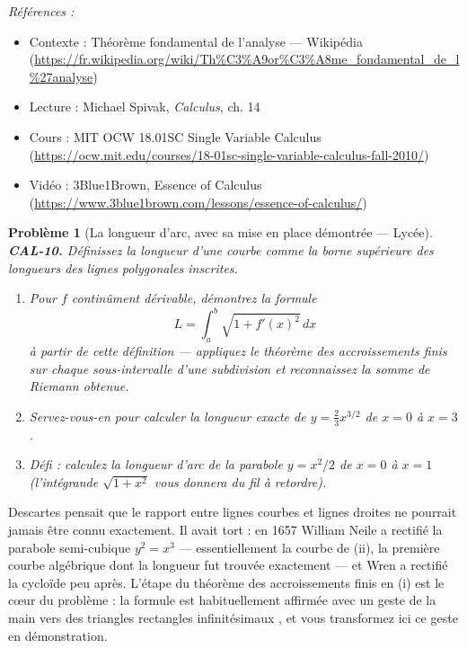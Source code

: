 \documentclass[11pt]{article}
\newtheorem{problem}{Problème}
\newenvironment{refs}{\par\small\noindent\emph{Références :}\begin{itemize}\setlength\itemsep{0pt}}{\end{itemize}\normalsize}
\begin{document}
\begin{refs}
\item Contexte : Théorème fondamental de l'analyse --- Wikipédia (\url{https://fr.wikipedia.org/wiki/Th%C3%A9or%C3%A8me_fondamental_de_l%27analyse})
\item Lecture : Michael Spivak, \textit{Calculus}, ch. 14
\item Cours : MIT OCW 18.01SC Single Variable Calculus (\url{https://ocw.mit.edu/courses/18-01sc-single-variable-calculus-fall-2010/})
\item Vidéo : 3Blue1Brown, Essence of Calculus (\url{https://www.3blue1brown.com/lessons/essence-of-calculus/})
\end{refs}

\bigskip

\begin{problem}[{La longueur d'arc, avec sa mise en place démontrée --- Lycée}]
\textbf{CAL-10.} Définissez la longueur d'une courbe comme la borne supérieure des
longueurs des lignes polygonales inscrites.
\begin{enumerate}
\item[(i)] Pour $ f $ continûment dérivable, démontrez
la formule
\[ L = \int_a^b \sqrt{1 + f'(x)^2}\,dx \]
à partir de cette définition --- appliquez le théorème des accroissements finis sur chaque sous-intervalle d'une subdivision et
reconnaissez la somme de Riemann obtenue.
\item[(ii)] Servez-vous-en pour calculer la longueur exacte de
$ y = \tfrac{2}{3}x^{3/2} $ de $ x=0 $ à $ x=3 $.
\item[(iii)] Défi : calculez la
longueur d'arc de la parabole $ y = x^2/2 $ de $ x=0 $ à $ x=1 $ (l'intégrande
$ \sqrt{1+x^2} $ vous donnera du fil à retordre).
\end{enumerate}

\end{problem}

\noindent Descartes pensait que le rapport entre lignes courbes et lignes droites ne pourrait
jamais être connu exactement. Il avait tort : en 1657 William Neile a rectifié la parabole
semi-cubique $ y^2 = x^3 $ --- essentiellement la courbe de (ii), la première courbe algébrique dont la longueur
fut trouvée exactement --- et Wren a rectifié la cycloïde peu après. L'étape du théorème des accroissements finis en (i) est
le c\oe{}ur du problème : la formule est habituellement affirmée avec un geste de la main vers des
\og{} triangles rectangles infinitésimaux \fg{}, et vous transformez ici ce geste en démonstration.
\end{document}
